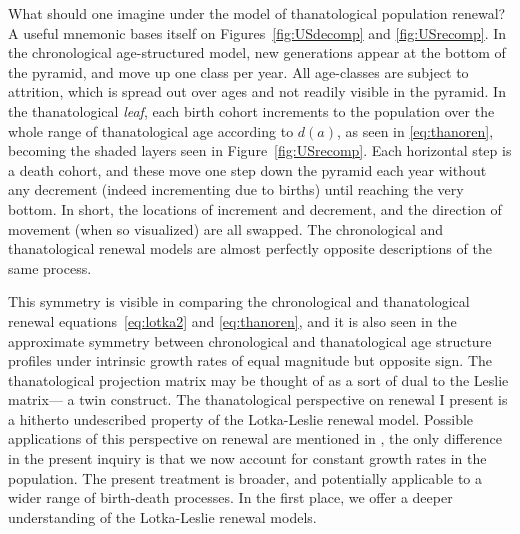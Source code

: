 \documentclass[12pt,oneside,a4paper,leqno]{article}
\begin{document}
What should one imagine under the model of thanatological population renewal? A useful mnemonic bases itself on Figures~\ref{fig:USdecomp} and \ref{fig:USrecomp}. In the chronological age-structured model, new generations appear at the bottom of the pyramid, and move up one class per year.
All age-classes are subject to attrition, which is spread out over ages and not
readily visible in the pyramid. In the thanatological \textit{leaf}, each birth cohort increments to the population over the whole range of thanatological age
according to $d(a)$, as seen in \eqref{eq:thanoren}, becoming the
shaded layers seen in Figure~\ref{fig:USrecomp}. Each horizontal step is a death
cohort, and these move one step down the pyramid each year without any decrement
(indeed incrementing due to births) until reaching the very bottom. In short,
the locations of increment and decrement, and the direction of movement (when
so visualized) are all swapped. The chronological and thanatological renewal
models are almost perfectly opposite descriptions of the same process. 

This symmetry is visible in comparing the
chronological and thanatological renewal equations~\eqref{eq:lotka2}
and \eqref{eq:thanoren}, and it is also seen in the approximate symmetry between
chronological and thanatological age structure profiles under intrinsic growth
rates of equal magnitude but opposite sign. The thanatological projection matrix may be thought of as a
sort of dual to the Leslie matrix--- a twin construct. The thanatological perspective on renewal I present is a hitherto undescribed property of the Lotka-Leslie renewal model. Possible applications of
this perspective on renewal are mentioned in \citet{riffe2015force}, the only
difference in the present inquiry is that we now account for constant growth rates in the
population. The present treatment is broader, and potentially applicable to a
wider range of birth-death processes. In the first place, we offer a deeper understanding
of the Lotka-Leslie renewal models.

\vspace{2em}
\end{document}
